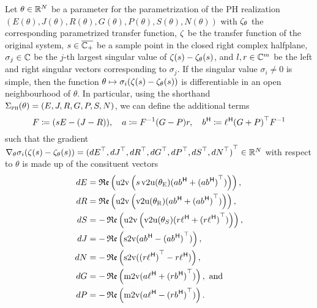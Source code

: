 \begin{theorem}
    Let $\theta \in \mathbb{R}^{N}$ be a parameter for the parametrization of the \ac{PH} realization $(E(\theta), J(\theta), R(\theta), G(\theta), P(\theta), S(\theta), N(\theta))$ with $\zeta_\theta$ the corresponding parametrized transfer function, $\zeta$ be the transfer function of the original system, $s \in \overline{\mathbb{C}_+}$ be a sample point in the closed right complex halfplane, $\sigma_j \in \mathbb{C}$ be the $j$-th largest singular value of $\zeta(s) - \zeta_\theta(s)$, and $l, r \in \mathbb{C}^m$ be the left and right singular vectors corresponding to $\sigma_j$.
    If the singular value $\sigma_i \neq 0$ is simple, then the function $\theta \mapsto \sigma_i(\zeta(s) - \zeta_\theta(s))$ is differentiable in an open neighbourhood of $\theta$.
    In particular, using the shorthand $\Sigma_{\textnormal{\scshape ph}}(\theta) = (E, J, R, G, P, S, N)$, we can define the additional terms
    \begin{equation*}
        F \coloneqq (s E - (J - R)),\quad a \coloneqq F\inv (G - P) r,\quad b\herm \coloneqq \ell\herm {(G + P)}\trans F\inv
    \end{equation*}
    such that the gradient $\nabla_\theta \sigma_i(\zeta(s) - \zeta_\theta(s)) = {({dE}^{\top}, {dJ}^{\top}, {dR}^{\top}, {dG}^{\top}, {dP}^{\top}, {dS}^{\top}, {dN}^{\top})}^{\top} \in \mathbb{R}^N$ with respect to $\theta$ is made up of the consituent vectors
    \begin{equation*}
        \begin{aligned}
            dE &= \re{\uppervec\left( s \vecupper(\theta_\msc{E}) (a b\herm + {(a b\herm)}\trans) \right)}, \\
            dR &= \re{\uppervec\left( \vecupper(\theta_\msc{R}) (a b\herm + {(a b\herm)}\trans) \right)}, \\
            dS &= - \re{\uppervec\left( \vecupper(\theta_S) (r \ell\herm + {(r \ell\herm)}\trans) \right)}, \\
            dJ &= - \re{\strictvec(a b\herm - {(a b\herm)}\trans)}, \\
            dN &= - \re{\strictvec({(r \ell\herm)}\trans - r \ell\herm)}, \\
            dG &= - \re{\matvec(a \ell\herm + {(r b\herm)}\trans)}, \text{ and} \\
            dP &= - \re{\matvec(a \ell\herm - {(r b\herm)}\trans)}.
        \end{aligned}
    \end{equation*}
\end{theorem}

